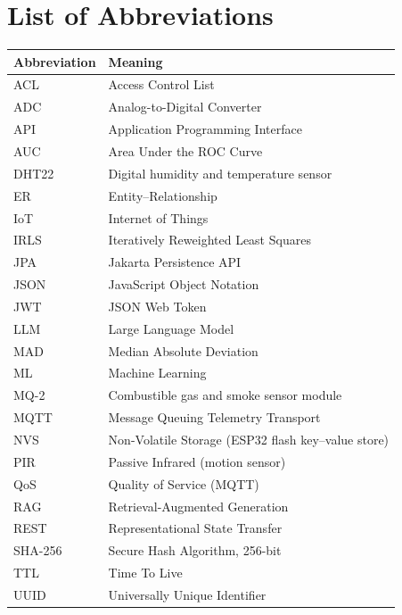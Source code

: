\documentclass[12pt,a4paper,oneside]{report}
\begin{document}
\chapter*{List of Abbreviations}
\begin{tabularx}{\textwidth}{lX}
\toprule
\textbf{Abbreviation} & \textbf{Meaning}\\
\midrule
ACL & Access Control List\\
ADC & Analog-to-Digital Converter\\
API & Application Programming Interface\\
AUC & Area Under the ROC Curve\\
DHT22 & Digital humidity and temperature sensor\\
ER & Entity--Relationship\\
IoT & Internet of Things\\
IRLS & Iteratively Reweighted Least Squares\\
JPA & Jakarta Persistence API\\
JSON & JavaScript Object Notation\\
JWT & JSON Web Token\\
LLM & Large Language Model\\
MAD & Median Absolute Deviation\\
ML & Machine Learning\\
MQ-2 & Combustible gas and smoke sensor module\\
MQTT & Message Queuing Telemetry Transport\\
NVS & Non-Volatile Storage (ESP32 flash key--value store)\\
PIR & Passive Infrared (motion sensor)\\
QoS & Quality of Service (MQTT)\\
RAG & Retrieval-Augmented Generation\\
REST & Representational State Transfer\\
SHA-256 & Secure Hash Algorithm, 256-bit\\
TTL & Time To Live\\
UUID & Universally Unique Identifier\\
\bottomrule
\end{tabularx}

\clearpage
{}
\setcounter{page}{1}

\end{document}
